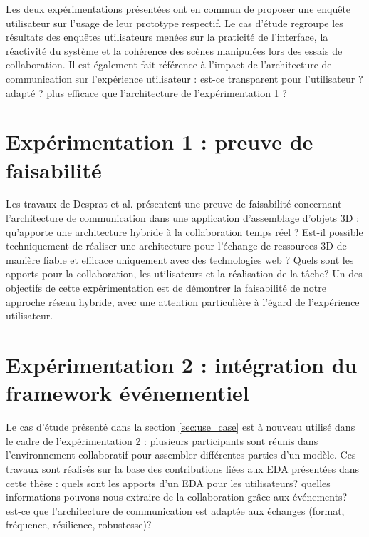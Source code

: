 Les deux expérimentations présentées ont en commun de proposer une enquête 
utilisateur sur l'usage de leur prototype respectif. Le cas d'étude regroupe les 
résultats des enquêtes utilisateurs menées sur la praticité de l'interface, la réactivité du système et la cohérence des scènes manipulées lors des essais de collaboration. 
Il est également fait référence à l'impact de l'architecture de communication 
sur l'expérience utilisateur 
: est-ce transparent pour l'utilisateur ? adapté ? plus efficace que l'architecture de l'expérimentation 1 ?




\section{Expérimentation 1 : preuve de faisabilité}

Les travaux de Desprat et al. \cite{Desprat2015a, Desprat2015b} présentent 
une preuve de faisabilité concernant l'architecture de communication dans une application d'assemblage d'objets 3D : qu'apporte une architecture hybride à la collaboration temps réel ? Est-il 
possible techniquement de réaliser une 
architecture pour l'échange de ressources \gls{3D} de manière fiable et 
efficace 
uniquement avec des technologies web ? Quels sont les apports pour la 
collaboration, les utilisateurs et la réalisation de la tâche?
Un des objectifs de cette expérimentation est de démontrer la faisabilité de notre 
approche réseau hybride, avec une attention particulière à l'égard de l'expérience 
utilisateur.



\section{Expérimentation 2 : intégration du framework événementiel}
\label{sec:xp2}

Le cas d'étude présenté dans la section \ref{sec:use_case} est à nouveau utilisé 
dans le cadre de l'expérimentation 2 : plusieurs 
participants sont réunis dans l'environnement collaboratif pour assembler différentes parties d'un modèle. Ces travaux sont réalisés sur la base des 
contributions liées aux \gls{EDA} présentées dans cette thèse : 
quels sont les 
apports d'un \gls{EDA} pour les utilisateurs? quelles informations pouvons-nous 
extraire de la collaboration grâce aux événements? est-ce que l'architecture de 
communication est adaptée aux échanges (format, fréquence, résilience, 
robustesse)? 






